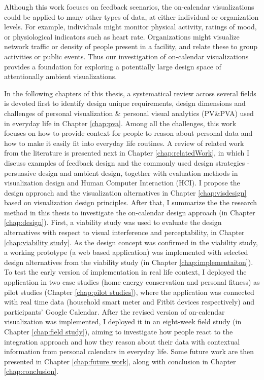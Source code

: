 \documentclass[12pt,oneside]{book}
\begin{document}
Although this work focuses on feedback scenarios, the on-calendar visualizations could be applied to many other types of data, at either individual or organization levels. For example, individuals might monitor physical activity, ratings of mood, or physiological indicators such as heart rate.  Organizations might visualize network traffic or density of people present in a facility, and relate these to group activities or public events. Thus our investigation of on-calendar visualizations provides a foundation for exploring a potentially large design space of attentionally ambient visualizations.

In the following chapters of this thesis, a systematical review across several fields is devoted first to identify design unique requirements, design dimensions and challenges of personal visualization \& personal visual analytics (PV\&PVA) used in everyday life in Chapter \ref{chap:pva}.  Among all the challenges, this work focuses on how to provide context for people to reason about personal data and how to make it easily fit into everyday life routines.  A review of related work from the literature is presented next in Chapter \ref{chap:relatedWork}, in which I discuss examples of feedback design and the commonly used design strategies - persuasive design and ambient design, together with evaluation methods in visualization design and Human Computer Interaction (HCI).  I propose the design approach and the visualization alternatives in Chapter \ref{chap:visdesign} based on visualization design principles.  After that, I summarize the the research method in this thesis to investigate the on-calendar design approach (in Chapter \ref{chap:design}). First, a viability study was used to evaluate the design alternatives with respect to visual interference and perceptability, in Chapter \ref{chap:viability study}.  As the design concept was confirmed in the viability study, a working prototype (a web based application) was implemented with selected design alternatives from the viability study (in Chapter \ref{chap:implementaiton}).  To test the early version of implementation in real life context, I deployed the application in two case studies (home energy conservation and personal fitness) as pilot studies (Chapter \ref{chap:pilot studies}), where the application was connected with real time data (household smart meter and Fitbit devices respectively) and participants' Google Calendar.  After the revised version of on-calendar visualization was implemented, I deployed it in an eight-week field study (in Chapter \ref{chap:field study}), aiming to investigate how people react to the integration approach and how they reason about their data with contextual information from personal calendars in everyday life. Some future work are then presented in Chapter \ref{chap:future work}, along with conclusion in Chapter \ref{chap:conclusion}.
\end{document}
